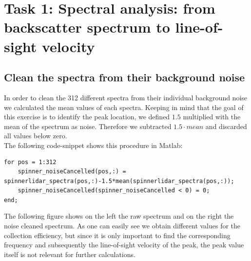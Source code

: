 \documentclass[10pt]{article}
\begin{document}
\section{Task 1: Spectral analysis: from backscatter spectrum to line-of-sight velocity}
\subsection{Clean the spectra from their background noise}
In order to clean the 312 different spectra from their individual background noise we calculated the mean values of each spectra. Keeping in mind that the goal of this exercise is to identify the peak location, we defined $1.5$ multiplied with the mean of the spectrum as noise. Therefore we subtracted $1.5 \cdot mean$ and discarded all values below zero.\\
The following code-snippet shows this procedure in Matlab:

\begin{lstlisting}
for pos = 1:312
    spinner_noiseCancelled(pos,:) = spinnerlidar_spectra(pos,:)-1.5*mean(spinnerlidar_spectra(pos,:));
    spinner_noiseCancelled(spinner_noiseCancelled < 0) = 0;
end;
\end{lstlisting}

The following figure shows on the left the raw spectrum and on the right the noise cleaned spectrum. As one can easily see we obtain different values for the collection efficiency, but since it is only important to find the corresponding frequency and subsequently the line-of-sight velocity of the peak, the peak value itself is not relevant for further calculations.
\end{document}

